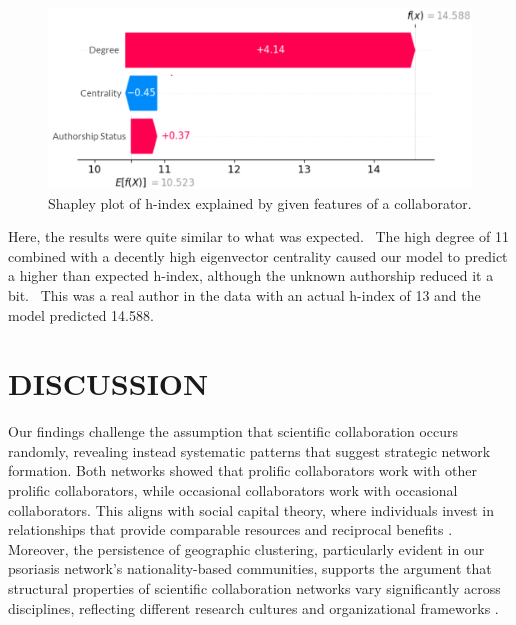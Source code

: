 \documentclass[9pt,twocolumn,twoside]{pnas-new}
\begin{document}
\begin{figure}[H]
    \centering
        \includegraphics[width=0.37\textheight]{shap1.png}
    \caption{Shapley plot of h-index explained by given features of a collaborator.}
    \label{fig:shap1}
\end{figure}
\noindent Here, the results were quite similar to what was expected.  The high degree of 11 combined with a decently high eigenvector centrality caused our model to predict a higher than expected h-index, although the unknown authorship reduced it a bit.  This was a real author in the data with an actual h-index of 13 and the model predicted 14.588. 

  \section*{DISCUSSION}
\noindent Our findings challenge the assumption that scientific collaboration occurs randomly, revealing instead systematic patterns that suggest strategic network formation. Both networks showed that prolific collaborators work with other prolific collaborators, while occasional collaborators work with occasional collaborators. This aligns with social capital theory, where individuals invest in relationships that provide comparable resources and reciprocal benefits \cite{borner2005studying}. Moreover, the persistence of geographic clustering, particularly evident in our psoriasis network's nationality-based communities, supports the argument that structural properties of scientific collaboration networks vary significantly across disciplines, reflecting different research cultures and organizational frameworks \cite{wagner2011approaches}.
\newline
\end{document}
